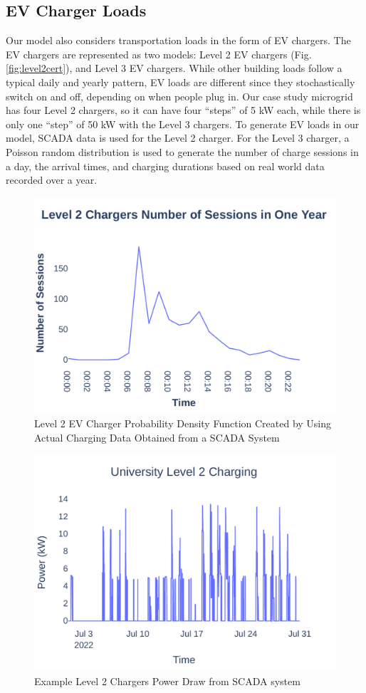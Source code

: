 \documentclass[conference]{IEEEtran}
\begin{document}
    \subsection{EV Charger Loads }
   		Our model also considers transportation loads in the form of EV chargers. The EV chargers are represented as two models: Level 2 EV chargers (Fig. \ref{fig:level2cert}), and Level 3 EV chargers. While other building loads follow a typical daily and yearly pattern, EV loads are different since they stochastically switch on and off, depending on when people plug in. Our case study microgrid has four Level 2 chargers, so it can have four ``steps'' of 5 kW each, while there is only one ``step'' of 50 kW with the Level 3 chargers. To generate EV loads in our model, SCADA data is used for the Level 2 charger.  For the Level 3 charger, a Poisson random distribution is used to generate the number of charge sessions in a day, the arrival times, and charging durations based on real world data recorded over a year. 
		\begin{figure}
			\centering
			\includegraphics[width=0.9\linewidth]{Fig/Option_3/l2_avg_day_rand_poisson_1_hour_real.pdf}
			\caption{\footnotesize Level 2 EV Charger Probability Density Function  Created  by Using Actual Charging Data Obtained from a SCADA System}
			\label{fig:l2avgdayrandpoisson1hourpdf}
		\end{figure}
		\begin{figure}
			\centering
			\includegraphics[width=0.9\linewidth]{Fig/Option_3/L2_short.pdf}
			\caption{\footnotesize Example Level 2 Chargers Power Draw from SCADA system}
			\label{fig:l2short}
		\end{figure}
\end{document}
